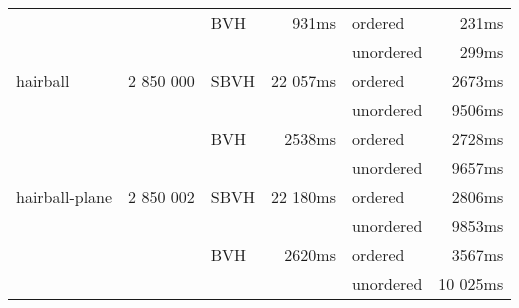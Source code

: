 \begin{tabular}{lrlrlr}
                   &           & BVH  &    931ms & ordered   &   231ms \\
                   &           &      &          & unordered &   299ms \\
    \midrule                                     
    hairball       & 2 850 000 & SBVH & 22 057ms & ordered   &  2673ms \\
                   &           &      &          & unordered &  9506ms \\
                   &           & BVH  &   2538ms & ordered   &  2728ms \\
                   &           &      &          & unordered &  9657ms \\
    \midrule                                     
    hairball-plane & 2 850 002 & SBVH & 22 180ms & ordered   &  2806ms \\
                   &           &      &          & unordered &  9853ms \\
                   &           & BVH  &   2620ms & ordered   &  3567ms \\
                   &           &      &          & unordered & 10 025ms \\
    \bottomrule
\end{tabular}


